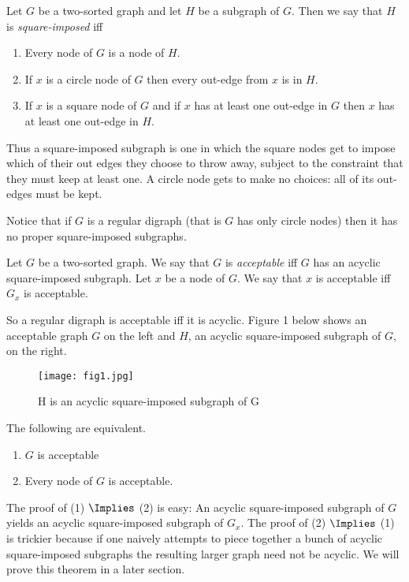 \documentclass[oneside,12pt]{amsart}
\begin{document}
\begin{definition}
Let $G$ be a two-sorted graph and let $H$ be a subgraph of $G$. Then we say that
$H$ is \emph{square-imposed} iff
\begin{enumerate}
\item Every node of $G$ is a node of $H$.
\item If $x$ is a circle node of $G$ then every out-edge from $x$ is in $H$.
\item If $x$ is a square node of $G$ and if $x$ has at least one out-edge
in $G$ then $x$ has at least one out-edge in $H$.
\end{enumerate}

Thus a square-imposed subgraph is one in which the square nodes get to impose
which of their out edges they choose to throw away, subject to the constraint that
they must keep at least one. A circle node gets to make
no choices: all of its out-edges must be kept. 

Notice that if $G$ is a regular digraph (that is $G$ has only circle nodes) then it
has no proper square-imposed subgraphs.

\begin{definition}
Let $G$ be a two-sorted graph. We say that $G$ is \emph{acceptable} iff $G$ has
an acyclic square-imposed subgraph. Let $x$ be a node of $G$. We say that $x$ is
acceptable iff $G_x$ is acceptable.
\end{definition}

So a regular digraph is acceptable iff it is acyclic. Figure 1 below shows an acceptable graph $G$ on the left
and $H$, an acyclic square-imposed subgraph of $G$, on the right.

\begin{figure}[h]
    \centering
    \texttt{[image: fig1.jpg]}
    \caption{H is an acyclic square-imposed subgraph of G}
    \label{fig:fig1}
\end{figure}

\begin{theorem}
\label{Acceptability-Is-Local}
The following are equivalent.
\begin{enumerate}
\item $G$ is acceptable
\item Every node of $G$ is acceptable.
\end{enumerate}
\end{theorem}

The proof of (1) $\Implies$ (2) is easy:  An acyclic square-imposed subgraph of $G$
yields an acyclic square-imposed subgraph of $G_x$. The proof of (2) $\Implies$ (1)
is trickier because if one naively attempts to piece together a bunch of acyclic square-imposed
subgraphs the resulting larger graph need not be acyclic. We will prove this theorem in a later section.

\end{definition}
\end{document}

